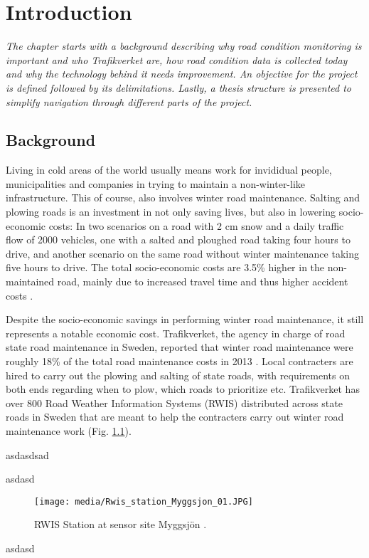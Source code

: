 \chapter{Introduction}
\emph{The chapter starts with a background describing why road condition monitoring is important and who Trafikverket are, how road condition data is collected today and why the technology behind it needs improvement. An objective for the project is defined followed by its delimitations. Lastly, a thesis structure is presented to simplify navigation through different parts of the project.}

\section{Background}
	Living in cold areas of the world usually means work for invididual people, municipalities and companies in trying to maintain a non-winter-like infrastructure. This of course, also involves winter road maintenance. Salting and plowing roads is an investment in not only saving lives, but also in lowering socio-economic costs: In two scenarios on a road with 2 cm snow and a daily traffic flow of 2000 vehicles, one with a salted and ploughed road taking four hours to drive, and another scenario on the same road without winter maintenance taking five hours to drive. The total socio-economic costs are 3.5\% higher in the non-maintained road, mainly due to increased travel time and thus higher accident costs \cite{ARTICLE:1}. 

	Despite the socio-economic savings in performing winter road maintenance, it still represents a notable economic cost. Trafikverket, the agency in charge of road state road maintenance in Sweden, reported that winter road maintenance were roughly 18\% of the total road maintenance costs in 2013 \cite{REPORT:1}. Local contracters are hired to carry out the plowing and salting of state roads, with requirements on both ends regarding when to plow, which roads to prioritize etc. Trafikverket has over 800 Road Weather Information Systems (RWIS) distributed across state roads in Sweden that are meant to help the contracters carry out winter road maintenance work (Fig. \ref{img:rwis}).

asdasdsad

asdasd
\begin{figure}[H]
	\centering
	\texttt{[image: media/Rwis\_station\_Myggsjon\_01.JPG]}
	\caption{RWIS Station at sensor site Myggsjön \cite{IMAGE:1}.}
	\label{img:rwis}
\end{figure}
asdasd

